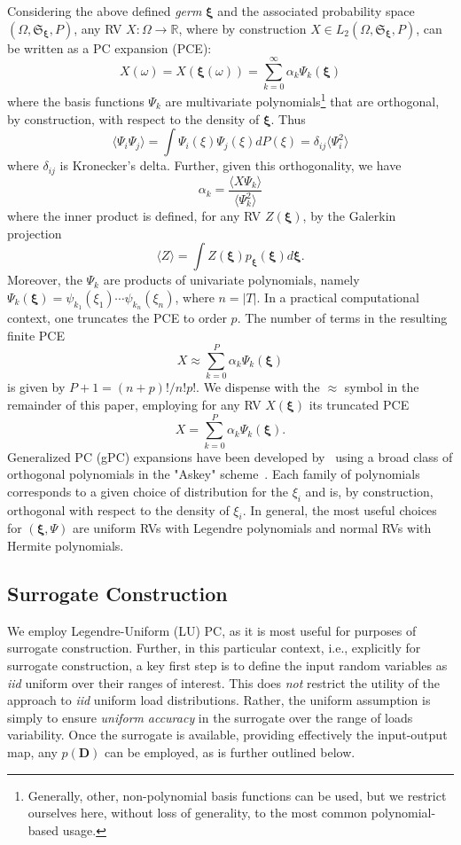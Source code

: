 \documentclass[conference]{IEEEtran}
\newcommand{\be}{\begin{equation}}
\newcommand{\ee}{\end{equation}}
\newcommand{\Sfr}{\mathfrak{S}}
\newcommand{\xivec}{{\boldsymbol{\xi}}}
\begin{document}
Considering the above defined \emph{germ} $\xivec$ and the associated
probability space $(\Omega,\Sfr_\xivec,P)$, any RV $X: \Omega \rightarrow
\mathbb{R}$, where by construction $X\in L_2(\Omega,\Sfr_\xivec,P)$, can be
written as a PC expansion (PCE):
\be
X(\omega) = X(\xivec(\omega)) = \sum_{k=0}^{\infty} \alpha_k \Psi_k(\xivec)
\label{eq:pcedef}
\ee
where the basis functions $\Psi_k$ are multivariate
polynomials\footnote{Generally, other, non-polynomial basis functions can be
used, but we restrict ourselves here, without loss of generality, to the most
common polynomial-based usage.} that are orthogonal, by construction, with respect to the density of
$\xivec$. Thus
\be
\langle \Psi_i\Psi_j\rangle =
\int\Psi_i(\xi)\Psi_j(\xi)dP(\xi)=\delta_{ij}\langle \Psi_i^2\rangle
\ee
where $\delta_{ij}$ is Kronecker's delta. 
Further, given this orthogonality, we have
\be
\alpha_k = \frac{\langle X\Psi_k \rangle}{\langle\Psi_k^2\rangle}
\ee
where the inner product is defined, for any RV $Z(\xivec)$, by the Galerkin projection
\be
\langle Z \rangle = \int Z(\xivec) p_\xivec(\xivec) d\xivec .
\label{eq:proj}
\ee
Moreover, the $\Psi_k$ are products of univariate polynomials, namely
$\Psi_k(\xivec) =\psi_{k_1}(\xi_1)\cdots \psi_{k_n}(\xi_n)$, where $n=|T|$. In a practical
computational context, one truncates the PCE to order $p$.  The number of terms
in the resulting finite PCE
\be
X \approx \sum_{k=0}^{P} \alpha_k \Psi_k(\xivec)
\ee
is given by $P+1 = { (n+p)! }/{n!p!}$. We dispense with the $\approx$ symbol in the 
remainder of this paper, employing for any RV $X(\xivec)$ its truncated PCE
\be
X = \sum_{k=0}^{P} \alpha_k \Psi_k(\xivec).
\label{eq:pce}
\ee
Generalized PC (gPC) expansions have been developed by~\cite{Xiu:2002c} using a
broad class of orthogonal polynomials in the "Askey" scheme~\cite{Askey:1985}.
Each family of polynomials corresponds to a given choice of distribution for the
$\xi_i$ and is, by construction, orthogonal with respect to the density of $\xi_i$.
In general, the most useful choices for $(\xivec,\Psi)$ are uniform RVs with
Legendre polynomials and normal RVs with Hermite polynomials.

\subsection{Surrogate Construction}

We employ Legendre-Uniform (LU) PC, as it is most useful for purposes of
surrogate construction. Further, in this particular context, i.e.,
explicitly for surrogate construction, a key first step is to define the input
random variables as \emph{iid} uniform over their ranges of interest.  This does
\emph{not} restrict the utility of the approach to \emph{iid} uniform load
distributions. Rather, the uniform assumption is simply to ensure \emph{uniform}
\emph{accuracy} in the surrogate over the range of loads variability.  Once the
surrogate is available, providing effectively the input-output map, any
$p(\boldsymbol D)$ can be employed, as is further outlined below.
\end{document}
